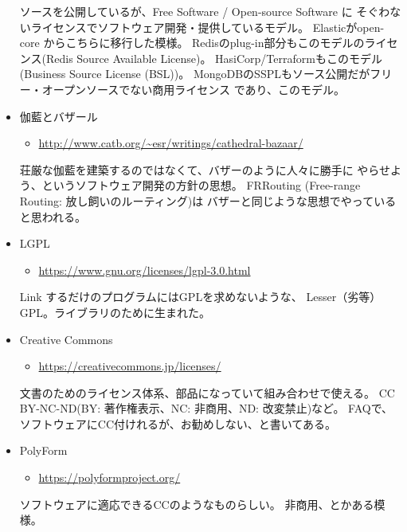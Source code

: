 \documentclass{jsarticle}
\begin{document}
\begin{itemize}
ソースを公開しているが、Free Software / Open-source Software に
そぐわないライセンスでソフトウェア開発・提供しているモデル。
Elasticがopen-core からこちらに移行した模様。
Redisのplug-in部分もこのモデルのライセンス(Redis Source Available License)。
HasiCorp/Terraformもこのモデル(Business Source License (BSL))。
MongoDBのSSPLもソース公開だがフリー・オープンソースでない商用ライセンス
であり、このモデル。

\item 伽藍とバザール
\begin{itemize}
\item \url{http://www.catb.org/~esr/writings/cathedral-bazaar/}
\end{itemize}

荘厳な伽藍を建築するのではなくて、バザーのように人々に勝手に
やらせよう、というソフトウェア開発の方針の思想。
FRRouting (Free-range Routing: 放し飼いのルーティング)は
バザーと同じような思想でやっていると思われる。

\item LGPL
\begin{itemize}
\item \url{https://www.gnu.org/licenses/lgpl-3.0.html}
\end{itemize}

Link するだけのプログラムにはGPLを求めないような、
Lesser（劣等）GPL。ライブラリのために生まれた。

\item Creative Commons
\begin{itemize}
\item \url{https://creativecommons.jp/licenses/}
\end{itemize}

文書のためのライセンス体系、部品になっていて組み合わせで使える。
CC BY-NC-ND(BY: 著作権表示、NC: 非商用、ND: 改変禁止)など。
FAQで、ソフトウェアにCC付けれるが、お勧めしない、と書いてある。

\item PolyForm
\begin{itemize}
\item \url{https://polyformproject.org/}
\end{itemize}

ソフトウェアに適応できるCCのようなものらしい。
非商用、とかある模様。

\end{itemize}
\end{document}

